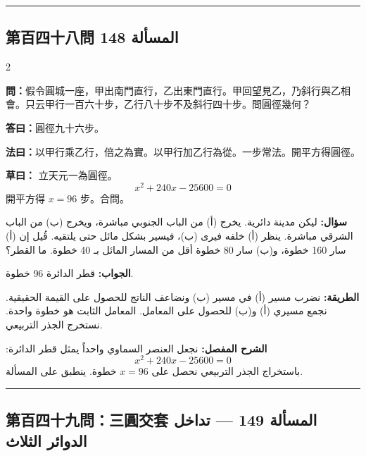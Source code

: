 \documentclass[11pt,a4paper]{article}
\newcommand{\ar}[1]{\arabicfont\beginR #1\endR}
\newcommand{\arb}[1]{\textbf{\arabicfont\beginR #1\endR}}
\newcommand{\longline}{\noindent\rule{\textwidth}{0.4pt}}
\newcommand{\arnote}[1]{\textcolor{arabicblue}{\ar{#1}}}
\newcommand{\wen}[1]{\par\noindent\textbf{\textcolor{probcolor}{問：}}{#1}\par}
\newcommand{\da}[1]{\par\noindent\textbf{\textcolor{anscolor}{答曰：}}{#1}\par}
\newcommand{\fayue}[1]{\par\noindent\textbf{\textcolor{methodcolor}{法曰：}}{#1}\par}
\newcommand{\caoyue}[1]{\par\noindent\textbf{草曰：}{#1}\par}
\newcommand{\arwen}[1]{\par\noindent\arb{سؤال: }\arnote{#1}\par}
\newcommand{\arjwb}[1]{\par\noindent\arb{الجواب: }\arnote{#1}\par}
\newcommand{\arqwd}[1]{\par\noindent\arb{الطريقة: }\arnote{#1}\par}
\newcommand{\arshr}[1]{\par\noindent\arb{الشرح المفصل: }\arnote{#1}\par}
\begin{document}
\vspace{0.3cm}
\longline

\subsection*{第百四十八問 \hfill \ar{المسألة 148}}

\begin{paracol}{2}

\begin{leftcolumn}
\wen{假令圓城一座，甲出南門直行，乙出東門直行。甲回望見乙，乃斜行與乙相會。只云甲行一百六十步，乙行八十步不及斜行四十步。問圓徑幾何？}

\da{圓徑九十六步。}

\fayue{以甲行乘乙行，倍之為實。以甲行加乙行為從。一步常法。開平方得圓徑。}

\caoyue{
立天元一為圓徑。
$$x^2 + 240x - 25600 = 0$$
開平方得 $x = 96$ 步。合問。}
\end{leftcolumn}

\begin{rightcolumn}
\arwen{ليكن مدينة دائرية. يخرج (أ) من الباب الجنوبي مباشرة، ويخرج (ب) من الباب الشرقي مباشرة. ينظر (أ) خلفه فيرى (ب)، فيسير بشكل مائل حتى يلتقيه. قُيل إن (أ) سار 160 خطوة، و(ب) سار 80 خطوة أقل من المسار المائل بـ 40 خطوة. ما القطر؟}

\arjwb{قطر الدائرة 96 خطوة.}

\arqwd{نضرب مسير (أ) في مسير (ب) ونضاعف الناتج للحصول على القيمة الحقيقية. نجمع مسيري (أ) و(ب) للحصول على المعامل. المعامل الثابت هو خطوة واحدة. نستخرج الجذر التربيعي.}

\arshr{نجعل العنصر السماوي واحداً يمثل قطر الدائرة:
$$x^2 + 240x - 25600 = 0$$
باستخراج الجذر التربيعي نحصل على $x = 96$ خطوة. ينطبق على المسألة.}
\end{rightcolumn}

\end{paracol}

\vspace{0.3cm}
\longline

\subsection*{第百四十九問：三圓交套 \hfill \ar{المسألة 149 — تداخل الدوائر الثلاث}}
\end{document}
